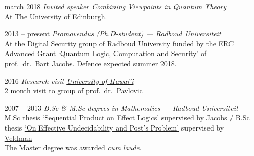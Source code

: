 \documentclass{article}
\newcommand\hsep{ {\color{gray}/} }
\newcommand\partitle[1]{\vskip20pt\par\noindent{\textsf{\textbf{#1}}}}
\begin{document}
\partitle{Academic career}
\begin{itemize}
    \item[march 2018] \emph{Invited speaker \href{http://homepages.inf.ed.ac.uk/cheunen/cvqt/}{Combining Viewpoints in Quantum Theory}}\\
        At The University of Edinburgh.
    \item[2013 -- present]  \emph{Promovendus (Ph.D-student) ---
        Radboud Universiteit}\\
        At the \href{http://www.ru.nl/ds/}{Digital Security group}
        of Radboud University funded by
        the ERC Advanced Grant \href{https://cordis.europa.eu/project/rcn/107285_en.html}{`Quantum Logic, Computation and Security'}
        of \href{http://www.cs.ru.nl/B.Jacobs/}{prof.~dr.~Bart Jacobs}.
            Defence expected summer 2018.
    \item[2016] \emph{Research visit \href{http://manoa.hawaii.edu}{University of Hawai'i}}\\
        2 month visit to group of \href{http://dusko.org}{prof.~dr.~Pavlovic}
    \item[2007 -- 2013] \emph{B.Sc \& M.Sc degrees in Mathematics ---
                Radboud Universiteit} \\
        M.Sc thesis \href{www.ru.nl/publish/pages/813276/masterscriptie_bas_westerbaan.pdf}{`Sequential Product on Effect Logics'}
            supervised by \href{http://www.cs.ru.nl/B.Jacobs/}{Jacobs} \hsep
        B.Sc thesis \href{https://arxiv.org/abs/1409.1030}{`On Effective Undecidability and Post's Problem'}
            supervised by \href{http://www.ru.nl/wiskunde/@1039532/veldman-dhr-dr-(wim)/}{Veldman}\\
        The Master degree was awarded \emph{cum laude}.
\end{itemize}
\end{document}
